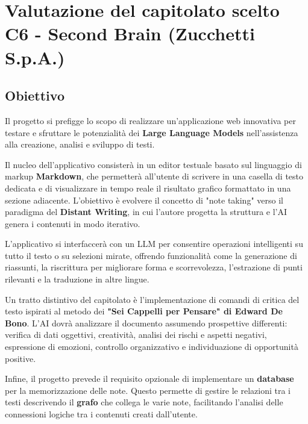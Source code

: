 \documentclass[a4paper, 10pt, colorlinks=true, linkcolor=black, urlcolor=blue, citecolor=blue, hidelinks]{article}
\begin{document}
\section{Valutazione del capitolato scelto C6 - Second Brain (Zucchetti S.p.A.)}

\subsection{Obiettivo}

Il progetto si prefigge lo scopo di realizzare un'applicazione web innovativa per testare e sfruttare le potenzialità dei \textbf{Large Language Models} nell'assistenza alla creazione, analisi e sviluppo di testi. 

Il nucleo dell'applicativo consisterà in un editor testuale basato sul linguaggio di markup \textbf{Markdown}, che permetterà all'utente di scrivere in una casella di testo dedicata e di visualizzare in tempo reale il risultato grafico formattato in una sezione adiacente. L'obiettivo è evolvere il concetto di "note taking" verso il paradigma del \textbf{Distant Writing}, in cui l'autore progetta la struttura e l'AI genera i contenuti in modo iterativo.

L'applicativo si interfaccerà con un LLM per consentire operazioni intelligenti su tutto il testo o su selezioni mirate, offrendo funzionalità come la generazione di riassunti, la riscrittura per migliorare forma e scorrevolezza, l'estrazione di punti rilevanti e la traduzione in altre lingue. 

Un tratto distintivo del capitolato è l'implementazione di comandi di critica del testo ispirati al metodo dei \textbf{"Sei Cappelli per Pensare" di Edward De Bono}. L'AI dovrà analizzare il documento assumendo prospettive differenti: verifica di dati oggettivi, creatività, analisi dei rischi e aspetti negativi, espressione di emozioni, controllo organizzativo e individuazione di opportunità positive.

Infine, il progetto prevede il requisito opzionale di implementare un \textbf{database} per la memorizzazione delle note. Questo permette di gestire le relazioni tra i testi descrivendo il \textbf{grafo} che collega le varie note, facilitando l'analisi delle connessioni logiche tra i contenuti creati dall'utente.
\end{document}
